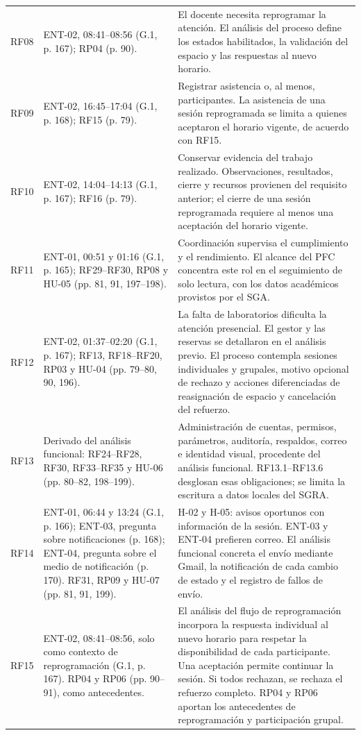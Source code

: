 \begin{longtable}{@{}p{}p{}p{}@{}}
RF08 & ENT-02, 08:41--08:56 (G.1, p. 167); RP04 (p. 90). & El docente necesita reprogramar la atención. El análisis del proceso define los estados habilitados, la validación del espacio y las respuestas al nuevo horario.\\
RF09 & ENT-02, 16:45--17:04 (G.1, p. 168); RF15 (p. 79). & Registrar asistencia o, al menos, participantes. La asistencia de una sesión reprogramada se limita a quienes aceptaron el horario vigente, de acuerdo con RF15.\\
RF10 & ENT-02, 14:04--14:13 (G.1, p. 167); RF16 (p. 79). & Conservar evidencia del trabajo realizado. Observaciones, resultados, cierre y recursos provienen del requisito anterior; el cierre de una sesión reprogramada requiere al menos una aceptación del horario vigente.\\
RF11 & ENT-01, 00:51 y 01:16 (G.1, p. 165); RF29--RF30, RP08 y HU-05 (pp. 81, 91, 197--198). & Coordinación supervisa el cumplimiento y el rendimiento. El alcance del PFC concentra este rol en el seguimiento de solo lectura, con los datos académicos provistos por el SGA.\\
RF12 & ENT-02, 01:37--02:20 (G.1, p. 167); RF13, RF18--RF20, RP03 y HU-04 (pp. 79--80, 90, 196). & La falta de laboratorios dificulta la atención presencial. El gestor y las reservas se detallaron en el análisis previo. El proceso contempla sesiones individuales y grupales, motivo opcional de rechazo y acciones diferenciadas de reasignación de espacio y cancelación del refuerzo.\\
RF13 & Derivado del análisis funcional: RF24--RF28, RF30, RF33--RF35 y HU-06 (pp. 80--82, 198--199). & Administración de cuentas, permisos, parámetros, auditoría, respaldos, correo e identidad visual, procedente del análisis funcional. RF13.1--RF13.6 desglosan esas obligaciones; se limita la escritura a datos locales del SGRA.\\
RF14 & ENT-01, 06:44 y 13:24 (G.1, p. 166); ENT-03, pregunta sobre notificaciones (p. 168); ENT-04, pregunta sobre el medio de notificación (p. 170). RF31, RP09 y HU-07 (pp. 81, 91, 199). & H-02 y H-05: avisos oportunos con información de la sesión. ENT-03 y ENT-04 prefieren correo. El análisis funcional concreta el envío mediante Gmail, la notificación de cada cambio de estado y el registro de fallos de envío.\\
RF15 & ENT-02, 08:41--08:56, solo como contexto de reprogramación (G.1, p. 167). RP04 y RP06 (pp. 90--91), como antecedentes. & El análisis del flujo de reprogramación incorpora la respuesta individual al nuevo horario para respetar la disponibilidad de cada participante. Una aceptación permite continuar la sesión. Si todos rechazan, se rechaza el refuerzo completo. RP04 y RP06 aportan los antecedentes de reprogramación y participación grupal.\\
\bottomrule
\end{longtable}
\endgroup

